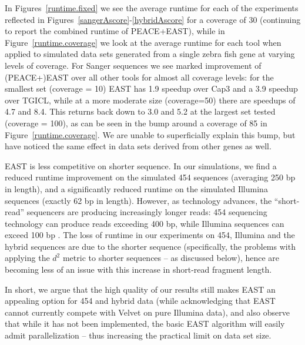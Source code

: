 \documentclass[10pt]{bmc_article}
\newcommand{\peace} {{\small PEACE}}
\newcommand{\capthree} {{\small Cap3}}
\newcommand{\tgicl} {{\small TGICL}}
\newcommand{\east} {{\small EAST}}
\newcommand{\velvet}{{\small Velvet}}
\newenvironment{bmcformat}{\begin{raggedright}\baselineskip20pt\sloppy\setboolean{publ}{false}}{\end{raggedright}\baselineskip20pt\sloppy}
\begin{document}
\begin{bmcformat}
 In Figures~\ref{runtime.fixed} we see
the average runtime for each of the experiments reflected in
Figures~\ref{sangerAscore}-\ref{hybridAscore} for a coverage of 30
(continuing to report the combined runtime of \peace+\east), while in
Figure~\ref{runtime.coverage} we look at the average runtime for each
tool when applied to simulated data sets generated from a single zebra
fish gene at varying levels of coverage.  For Sanger sequences we
see marked improvement of (\peace+)\east\/ over all other tools for
almost all coverage levels: for the smallest set (coverage = 10)
\east\/ has 1.9 speedup over \capthree\/ and a 3.9 speedup over
\tgicl, while at a more moderate size (coverage=50) there are speedups of
4.7 and 8.4.  This returns back down to 3.0 and 5.2 at the largest set
tested (coverage = 100), as can be seen in the bump around a coverage
of 85 in Figure~\ref{runtime.coverage}.  We are unable to
superficially explain this bump, but have noticed the same effect in
data sets derived from other genes as well.

\vspace{3mm}

\east\/ is less competitive on shorter sequence.  In our simulations,
we find a reduced runtime improvement on the simulated 454 sequences
(averaging 250 bp in length), and a significantly reduced runtime on
the simulated Illumina sequences (exactly 62 bp in length).  However,
as technology advances, the ``short-read'' sequencers are producing
increasingly longer reads: 454 sequencing technology can produce
reads exceeding 400 bp, while Illumina sequences can exceed 100 bp
\cite{Eid09,Li10}.  The loss of runtime in our experiments on 454,
Illumina and the hybrid sequences are due to the shorter sequence
(specifically, the problems with applying the $d^2$ metric to shorter
sequences -- as discussed below), hence are becoming less of an issue
with this increase in short-read fragment length.

\vspace{3mm}

In short, we argue that the high quality of our results still makes
\east\/ an appealing option for 454 and hybrid data (while
acknowledging that \east\/ cannot currently compete with \velvet\/ on pure
Illumina data), and also observe that while it has not been
implemented, the basic \east\/ algorithm will easily admit
parallelization -- thus increasing the practical limit on data set
size.


\end{bmcformat}
\end{document}
